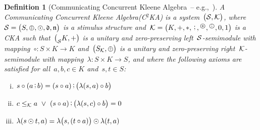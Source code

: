 \documentclass[copyright,creativecommons]{eptcs}
\makeatletter
\newcommand{\eg}{\textrm{e.g.,}\@\xspace}
\newcommand{\Lsemimodule}[3]{\big(_{#1}#2, #3\big)}
\newcommand{\Rsemimodule}[3]{\big(#2_{#1}, #3\big)}
\newcommand{\bigP}[1]{\big( #1 \big)}
\newcommand{\Or}{\mathrel{\vee}}
\newcommand{\Ors}{\;\Or\;}
\newcommand{\CKAabbrv}{CKA\@\xspace}
\newcommand{\CKAset}{K}
\newcommand{\CKApar}{*}
\newcommand{\CKAseq}{\raise.3ex\hbox{\,\rm;\,}}
\newcommand{\CKAiterSeqOp}{\text{\scriptsize \textcircled{\raise.3ex\hbox{\,\rm;\,}}}}
\newcommand{\CKAiterParOp}{\text{\scriptsize \textcircled{\raise-.75ex\hbox{\,*\,}}}}
\newcommand{\CKAiterSeq}[1]{{#1}^\CKAiterSeqOp}
\newcommand{\CKAiterPar}[1]{{#1}^\CKAiterParOp}
\newcommand{\cka}{{\cal K}}
\newcommand{\CKAstructure}{\bigP{\CKAset, +, \CKApar, \CKAseq, \CKAiterPar{}, \CKAiterSeq{}, 0, 1}}
\newcommand{\CKAle}{\le_{\cka}}
\newcommand{\STIMset}{S}
\newcommand{\STIMplus}{\oplus}
\newcommand{\STIMdot}{\odot}
\newcommand{\Nstim}{\mathfrak{n}}
\newcommand{\Dstim}{\mathfrak{d}}
\newcommand{\stim}{{\cal S}}
\newcommand{\STIMstructure}{\bigP{\STIMset, \STIMplus, \STIMdot, \Dstim, \Nstim}}
\newcommand{\rightSemimodule}[1]{right~$#1$-semimodule\@\xspace}
\newcommand{\leftSemimodule}[1]{left~$#1$-semimodule\@\xspace}
\newcommand{\actOp}{\circ}
\newcommand{\lActSig}{\actOp: \STIMset \times \CKAset \to \CKAset}
\newcommand{\lAct}[2]{{#2} \actOp {#1}}
\newcommand{\outOp}{\lambda}			\newcommand{\rOutSig}{\outOp: \CKAset \times \STIMset \to \STIMset}
\newcommand{\lOutSig}{\outOp: \STIMset \times \CKAset \to \STIMset}
\newcommand{\lOutbig}[2]{\outOp\bigP{#2,#1}}
\newcommand{\CCKA}{Communicating Concurrent Kleene Algebra\@\xspace}
\newcommand{\CCKAabbrv}{C$^2$KA\@\xspace}
\newcommand{\CCKAstructure}{\bigP{\stim, \cka}}
\newcommand{\ActSemimodule}{\Lsemimodule{\stim}{\CKAset}{+}}
\newcommand{\OutSemimodule}{\Rsemimodule{\cka}{\STIMset}{\STIMplus}}
\newtheorem{definition}{Definition}
\makeatother
\begin{document}
\begin{definition}[\CCKA\ -- \eg~\cite{Jaskolka2014aa}]
	\label{def:C2KA}
	A \emph{\CCKA (\CCKAabbrv)} is a system~$\CCKAstructure$, where $\stim = \STIMstructure$ is a stimulus structure and~$\cka = \CKAstructure$ is a \emph{\CKAabbrv} such that~$\ActSemimodule$ is a unitary and zero-preserving \emph{\leftSemimodule{\stim}} with mapping~$\lActSig$ and~$\OutSemimodule$ is a unitary and zero-preserving \emph{\rightSemimodule{\cka}} with mapping~$\lOutSig$, and where the following axioms are satisfied for all~$a,b,c \in \CKAset$ and~$s,t \in \STIMset$:
	\begin{multicols}{2}
	\begin{enumerate}[(i)]
		\item \label{def:cascading_axiom}
			$\lAct{(a \CKAseq b)}{s} = (\lAct{a}{s}) \CKAseq \bigP{\lAct{b}{\lOut{a}{s}}}$
		\item \label{def:cascading_output_axiom}
			$c \CKAle a \Ors (\lAct{a}{s}) \CKAseq \bigP{\lAct{b}{\lOut{c}{s}}} = 0$
		\item \label{def:sequential_output_axiom}
			$\lOut{a}{s \STIMdot t} =  \lOutbig{(\lAct{a}{t})}{s} \STIMdot \lOut{a}{t}$
	\end{enumerate}
	\end{multicols}
\end{definition}
\end{document}
